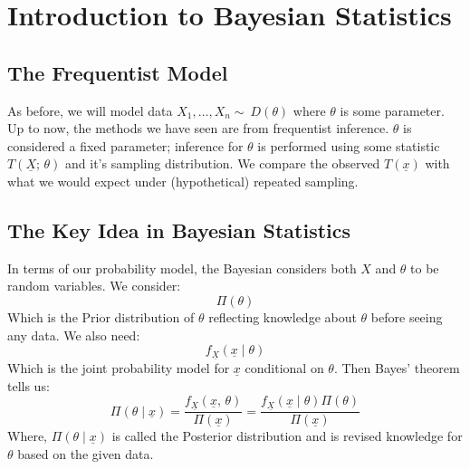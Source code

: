 \documentclass[12pt]{article}
\begin{document}
\section{Introduction to Bayesian Statistics}
\subsection{The Frequentist Model}
As before, we will model data \(X_1,\dots,X_n\sim\ D(\theta)\) where \(\theta\) is some parameter. Up to now, the methods we have seen are from frequentist inference. \(\theta\) is considered a fixed parameter; inference for \(\theta\) is performed using some statistic \(T(\underline{X};\, \theta)\) and it's sampling distribution. We compare the observed \(T(\underline{x})\) with what we would expect under (hypothetical) repeated sampling.
\subsection{The Key Idea in Bayesian Statistics}
In terms of our probability model, the Bayesian considers both \(X\) and \(\theta\) to be random variables. We consider:
\[\Pi(\theta)\]
Which is the Prior distribution of \(\theta\) reflecting knowledge about \(\theta\) before seeing any data. We also need:
\[f_{\underline{X}}(\underline{x}\mid \theta)\]
Which is the joint probability model for \(\underline{x}\) conditional on \(\theta\). Then Bayes' theorem tells us:
\[\Pi(\theta\mid \underline{x})=\frac{f_{\underline{X}}(\underline{x},\,\theta)}{\Pi(\underline{x})}=\frac{f_{\underline{X}}(\underline{x}\mid\theta)\Pi(\theta)}{\Pi(\underline{x})}\]
Where, \(\Pi(\theta\mid \underline{x})\) is called the Posterior distribution and is revised knowledge for \(\theta\) based on the given data.
\end{document}
